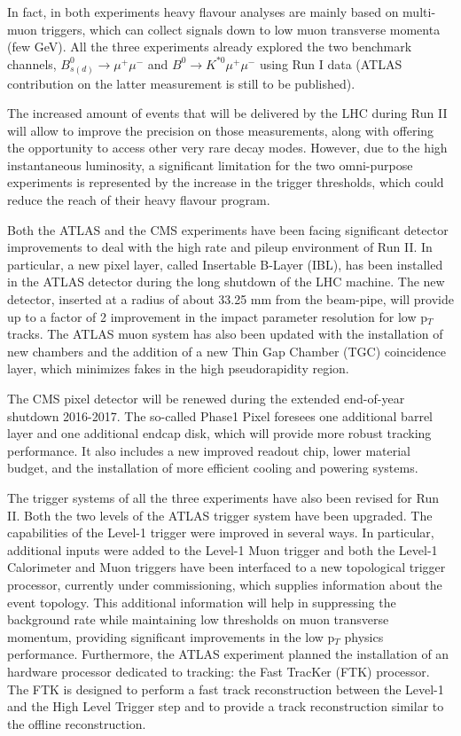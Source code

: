 In fact, in both experiments heavy flavour analyses are mainly based on multi-muon triggers, which can collect signals down to low muon transverse momenta (few GeV). 
All the three experiments already explored the two benchmark channels, $B^0_{s(d)} \to \mu^+\mu^-$ and $B^0 \to K^{\ast 0}\mu^+\mu^-$ using Run I data (ATLAS contribution on the latter measurement is still to be published).

The increased amount of events that will be delivered by the LHC during Run II will allow to improve the precision on those measurements, along with offering the opportunity to access other very rare decay modes.
However, due to the high instantaneous luminosity, a significant limitation for the two omni-purpose experiments is represented by the increase in the trigger thresholds, which could reduce the reach of their heavy flavour program.

Both the ATLAS and the CMS experiments have been facing significant detector improvements to deal with the high rate and pileup environment of Run II. 
In particular, a new pixel layer, called Insertable B-Layer (IBL), has been installed in the ATLAS detector during the long shutdown of the LHC machine. 
The new detector, inserted at a radius of about 33.25 mm from the beam-pipe, will provide up to a factor of 2 improvement in the impact parameter resolution for low p$_T$ tracks.
The ATLAS muon system has also been updated with the installation of new chambers and the addition of a new Thin Gap Chamber (TGC) coincidence layer, which minimizes fakes in the high pseudorapidity region.

The CMS pixel detector will be renewed during the extended end-of-year shutdown 2016-2017. 
The so-called Phase1 Pixel foresees one additional barrel layer and one additional endcap disk, which will provide more robust tracking performance. 
It also includes a new improved readout chip, lower material budget, and the installation of more efficient cooling and powering systems.


The trigger systems of all the three experiments have also been revised for Run II.
Both the two levels of the ATLAS trigger system have been upgraded.
The capabilities of the Level-1 trigger were improved in several ways.
In particular, additional inputs were added to the Level-1 Muon trigger and both the Level-1 Calorimeter and Muon triggers have been interfaced to a new topological trigger processor, currently under commissioning, which supplies information about the event topology. 
This additional information will help in suppressing the background rate while maintaining low thresholds on muon transverse momentum, providing significant improvements in the low p$_T$ physics performance.
Furthermore, the ATLAS experiment planned the installation of an hardware processor dedicated to tracking: the Fast TracKer (FTK) processor. 
The FTK is designed to perform a fast track reconstruction between the Level-1 and the High Level Trigger step and to provide a track reconstruction similar to the offline reconstruction.

